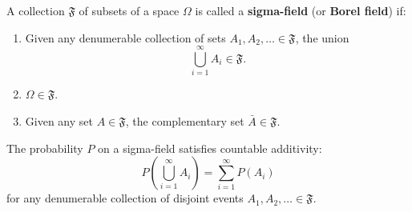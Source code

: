 A collection $\mathfrak{F}$ of subsets of a space $\Omega$ is called a \textbf{sigma-field} (or \textbf{Borel field}) if:
\begin{enumerate}
\item Given any denumerable collection of sets $A_1, A_2, \ldots \in \mathfrak{F}$, the union
  $$\bigcup_{i=1}^{\infty} A_i \in \mathfrak{F}.$$
\item $\Omega \in \mathfrak{F}$.
\item Given any set $A \in \mathfrak{F}$, the complementary set $\bar{A} \in \mathfrak{F}$.
\end{enumerate}

The probability $P$ on a sigma-field satisfies countable additivity:
$$P\left(\bigcup_{i=1}^{\infty} A_i\right) = \sum_{i=1}^{\infty} P(A_i)$$
for any denumerable collection of disjoint events $A_1, A_2, \ldots \in \mathfrak{F}$.
